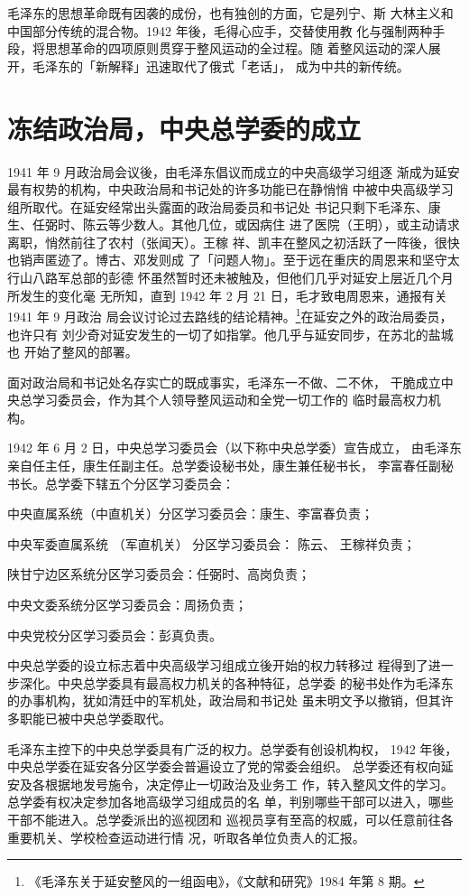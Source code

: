 毛泽东的思想革命既有因袭的成份，也有独创的方面，它是列宁、斯
大林主义和中国部分传统的混合物。1942 年後，毛得心应手，交替使用教
化与强制两种手段，将思想革命的四项原则贯穿于整风运动的全过程。随
着整风运动的深人展开，毛泽东的「新解释」迅速取代了俄式「老话」，
成为中共的新传统。
\section{
冻结政治局，中央总学委的成立}
1941 年 9 月政治局会议後，由毛泽东倡议而成立的中央高级学习组逐
渐成为延安最有权势的机构，中央政治局和书记处的许多功能已在静悄悄
中被中央高级学习组所取代。在延安经常出头露面的政治局委员和书记处
书记只剩下毛泽东、康生、任弼时、陈云等少数人。其他几位，或因病住
进了医院（王明），或主动请求离职，悄然前往了农村（张闻天）。王稼
祥、凯丰在整风之初活跃了一阵後，很快也销声匿迹了。博古、邓发则成
了「问题人物」。至于远在重庆的周恩来和坚守太行山八路军总部的彭德
怀虽然暂时还未被触及，但他们几乎对延安上层近几个月所发生的变化毫
无所知，直到 1942 年 2 月 21 日，毛才致电周恩来，通报有关 1941 年 9 月政治
局会议讨论过去路线的结论精神。\footnote{《毛泽东关于延安整风的一组函电》，《文献和研究》1984 年第 8 期。
}在延安之外的政治局委员，也许只有
刘少奇对延安发生的一切了如指掌。他几乎与延安同步，在苏北的盐城也
开始了整风的部署。

面对政治局和书记处名存实亡的既成事实，毛泽东一不做、二不休，
干脆成立中央总学习委员会，作为其个人领导整风运动和全党一切工作的
临时最高权力机构。

1942 年 6 月 2 日，中央总学习委员会（以下称中央总学委）宣告成立，
由毛泽东亲自任主任，康生任副主任。总学委设秘书处，康生兼任秘书长，
李富春任副秘书长。总学委下辖五个分区学习委员会：

中央直属系统（中直机关）分区学习委员会：康生、李富春负责；

中央军委直属系统
（军直机关）
分区学习委员会：
陈云、
王稼祥负责；

陕甘宁边区系统分区学习委员会：任弼时、高岗负责；

中央文委系统分区学习委员会：周扬负责；

中央党校分区学习委员会：彭真负责。

中央总学委的设立标志着中央高级学习组成立後开始的权力转移过
程得到了进一步深化。中央总学委具有最高权力机关的各种特征，总学委
的秘书处作为毛泽东的办事机构，犹如清廷中的军机处，政治局和书记处
虽未明文予以撤销，但其许多职能已被中央总学委取代。

毛泽东主控下的中央总学委具有广泛的权力。总学委有创设机构权，
1942 年後，中央总学委在延安各分区学委会普遍设立了党的常委会组织。
总学委还有权向延安及各根据地发号施令，决定停止一切政治及业务工
作，转入整风文件的学习。总学委有权决定参加各地高级学习组成员的名
单，判别哪些干部可以进入，哪些干部不能进入。总学委派出的巡视团和
巡视员享有至高的权威，可以任意前往各重要机关、学校检查运动进行情
况，听取各单位负责人的汇报。

